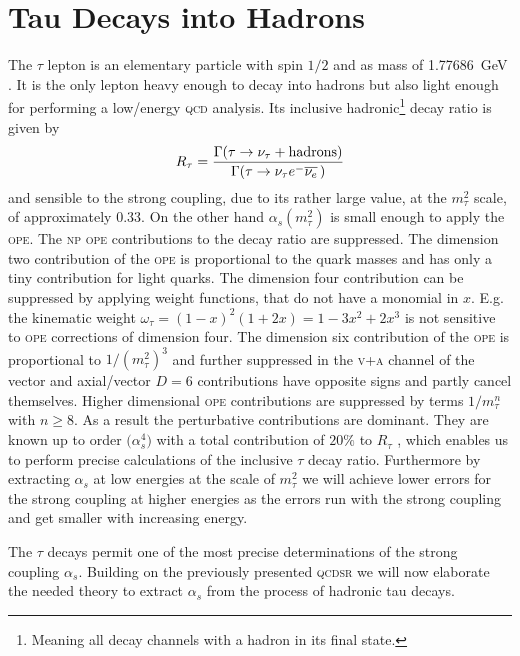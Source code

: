 \documentclass[../../index.tex]{subfiles}
\begin{document}
\chapter{Tau Decays into Hadrons}
The \(\tau\) lepton is an elementary particle with spin \(1/2\) and as mass of
\SI{1.77686}{\giga\eV} \cite{PDG2018}. It is the only lepton heavy enough to
decay into hadrons but also light enough for performing a low\-/energy
\textsc{qcd} analysis. Its inclusive hadronic\footnote{Meaning all decay
  channels with a hadron in its final state.} decay ratio is given by
\begin{equation}
  \label{eq:inclusiveRatio}
  R_\tau = \frac{\Gamma(\tau \to \nu_\tau + \text{hadrons})}{\Gamma(\tau \to \nu_\tau e^- \overline{\nu_e}\,)}
\end{equation}
and sensible to the strong coupling, due to its rather large value, at the
\(m_\tau^2\) scale, of approximately \(0.33\). On the other hand
\(\alpha_s(m_\tau^2)\) is small enough to apply the \textsc{ope}. The
\textsc{np} \textsc{ope} contributions to the decay ratio are suppressed. The
dimension two contribution of the \textsc{ope} is proportional to the quark
masses and has only a tiny contribution for light quarks. The dimension four
contribution can be suppressed by applying weight functions, that do not have a
monomial in \(x\). E.g. the kinematic weight
\(\omega_\tau=(1-x)^2(1+2x)=1-3x^2+2x^3\) is not sensitive to \textsc{ope}
corrections of dimension four. The dimension six contribution of the
\textsc{ope} is proportional to \(1/(m_\tau^2)^3\) and further suppressed in the
\textsc{v+a} channel of the vector and axial\-/vector \(D=6\)
contributions have opposite signs and partly cancel themselves. Higher dimensional
\textsc{ope} contributions are suppressed by terms \(1/m_\tau^n\) with \(n \geq
8\). As a result the perturbative contributions are dominant. They are known up
to order \(\mathcal(\alpha_s^4)\) with a total contribution of \(20\%\) to \(R_\tau\)
\cite{Pich2016a}, which enables us to perform precise calculations of the
inclusive \(\tau\) decay ratio. Furthermore by extracting \(\alpha_s\) at low
energies at the scale of \(m_\tau^2\) we will achieve lower errors for the
strong coupling at higher energies as the errors run with the strong coupling
and get smaller with increasing energy.

The \(\tau\) decays permit one of the most precise determinations of
the strong coupling \(\alpha_s\). Building on the previously presented
\textsc{qcdsr} we will now elaborate the needed theory to extract \(\alpha_s\)
from the process of hadronic tau decays.
\end{document}

